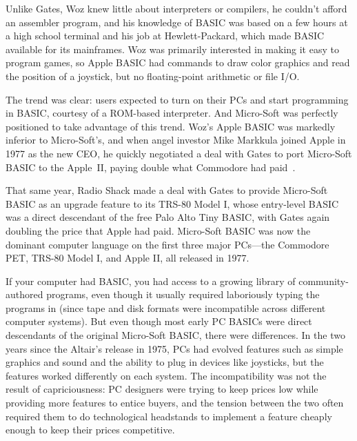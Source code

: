 \begin{tangent}
Unlike Gates, Woz knew little about interpreters or compilers, he
couldn't afford an assembler program, and his knowledge of BASIC was
based on a few hours at a high school terminal and his job at
Hewlett-Packard, which made BASIC available for its
mainframes.
Woz was primarily interested in making it easy to program games,
so Apple BASIC had
commands to draw color graphics and read the position of a joystick,
but no floating-point arithmetic or file I/O.
\end{tangent}


The trend was clear: users expected to turn on their PCs and
start programming in BASIC, courtesy of a ROM-based interpreter.
And Micro-Soft was perfectly positioned to take advantage of this trend.
Woz's Apple BASIC was markedly inferior to Micro-Soft's, and when
angel investor Mike
Markkula joined Apple in 1977 as the new CEO, he
quickly negotiated a deal with Gates to port Micro-Soft BASIC to
the Apple~II, paying double what Commodore had
paid~\cite[p. 114]{commodore}.

That same year, Radio Shack made a deal with Gates to provide Micro-Soft
BASIC as an upgrade feature to its TRS-80 Model I, whose entry-level BASIC
was a direct descendant of the free Palo Alto Tiny BASIC, with Gates
again doubling the price that Apple had paid.
Micro-Soft BASIC was now the dominant computer language on the first
three major PCs---the Commodore PET, TRS-80 Model I, and Apple II, all
released in 1977.


If your computer had BASIC, you had access to a growing library of
community-authored programs, even though it usually required laboriously
typing the programs in (since tape and disk formats were incompatible across
different computer systems).
But even though most early PC BASICs were direct descendants of the
original Micro-Soft BASIC, there were differences.
In the two years
since the Altair's release in 1975, PCs had evolved features such as
simple graphics and sound and the ability to plug in devices like
joysticks, but the features worked differently on each system.
The incompatibility was not the result of capriciousness: PC designers
were trying to keep prices low while providing more features to entice
buyers, and the tension between the two often required them to do
technological headstands to implement a feature cheaply enough to keep
their prices competitive.


